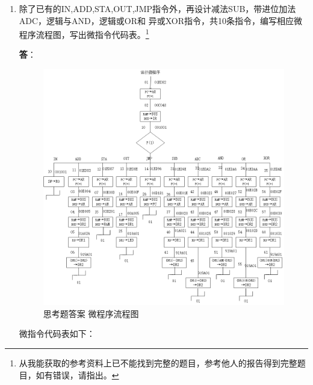 \begin{enumerate}
    \item 除了已有的IN,ADD,STA,OUT,JMP指令外，再设计减法SUB，带进位加法ADC，逻辑与AND，逻辑或OR和 异或XOR指令，共10条指令，编写相应微程序流程图，写出微指令代码表。\footnote{从我能获取的参考资料上已不能找到完整的题目，参考他人的报告得到完整题目，如有错误，请指出。}
    
    \textbf{答}：
    
    \begin{figure}[H]
    \centering
    \includegraphics[width=\textwidth]{images/ans6_1.png}
    \caption{思考题答案 微程序流程图}
    \label{fig:ans6_1}
    \end{figure}
    
    微指令代码表如下：
    

\end{enumerate}
